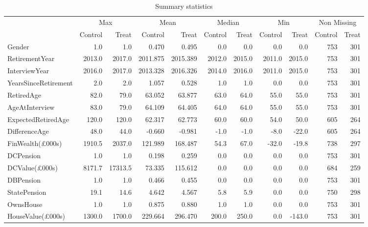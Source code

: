 \begin{table}

\caption{Summary statistics \label{tab:sum_stats} }
\centering
\fontsize{10}{12}\selectfont
\begin{tabular}[t]{lrrrrrrrrrr}
\toprule
\multicolumn{1}{c}{ } & \multicolumn{2}{c}{Max} & \multicolumn{2}{c}{Mean} & \multicolumn{2}{c}{Median} & \multicolumn{2}{c}{Min} & \multicolumn{2}{c}{Non Missing} \\
\cmidrule(l{3pt}r{3pt}){2-3} \cmidrule(l{3pt}r{3pt}){4-5} \cmidrule(l{3pt}r{3pt}){6-7} \cmidrule(l{3pt}r{3pt}){8-9} \cmidrule(l{3pt}r{3pt}){10-11}
 & Control & Treat & Control & Treat & Control & Treat & Control & Treat & Control & Treat\\
\midrule
Gender & 1.0 & 1.0 & 0.470 & 0.495 & 0.0 & 0.0 & 0.0 & 0.0 & 753 & 301\\
RetirementYear & 2013.0 & 2017.0 & 2011.875 & 2015.389 & 2012.0 & 2015.0 & 2011.0 & 2015.0 & 753 & 301\\
InterviewYear & 2016.0 & 2017.0 & 2013.328 & 2016.326 & 2014.0 & 2016.0 & 2011.0 & 2015.0 & 753 & 301\\
YearsSinceRetirement & 2.0 & 2.0 & 1.057 & 0.528 & 1.0 & 1.0 & 0.0 & 0.0 & 753 & 301\\
RetiredAge & 82.0 & 79.0 & 63.052 & 63.877 & 63.0 & 64.0 & 55.0 & 55.0 & 753 & 301\\
\addlinespace
AgeAtInterview & 83.0 & 79.0 & 64.109 & 64.405 & 64.0 & 64.0 & 55.0 & 55.0 & 753 & 301\\
ExpectedRetiredAge & 120.0 & 120.0 & 62.317 & 62.773 & 60.0 & 60.0 & 54.0 & 50.0 & 605 & 264\\
DifferenceAge & 48.0 & 44.0 & -0.660 & -0.981 & -1.0 & -1.0 & -8.0 & -22.0 & 605 & 264\\
FinWealth(£000s) & 1910.5 & 2037.0 & 121.989 & 168.487 & 54.3 & 67.0 & -32.0 & -19.8 & 738 & 297\\
DCPension & 1.0 & 1.0 & 0.198 & 0.259 & 0.0 & 0.0 & 0.0 & 0.0 & 753 & 301\\
\addlinespace
DCValue(£000s) & 8171.7 & 17313.5 & 73.335 & 115.612 & 0.0 & 0.0 & 0.0 & 0.0 & 684 & 259\\
DBPension & 1.0 & 1.0 & 0.466 & 0.455 & 0.0 & 0.0 & 0.0 & 0.0 & 753 & 301\\
StatePension & 19.1 & 14.6 & 4.642 & 4.567 & 5.8 & 5.9 & 0.0 & 0.0 & 750 & 298\\
OwnsHouse & 1.0 & 1.0 & 0.875 & 0.880 & 1.0 & 1.0 & 0.0 & 0.0 & 753 & 301\\
HouseValue(£000s) & 1300.0 & 1700.0 & 229.664 & 296.470 & 200.0 & 250.0 & 0.0 & -143.0 & 753 & 301\\

\end{tabular}
\end{table}

